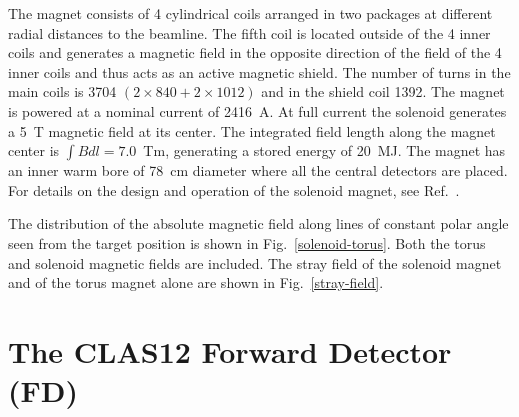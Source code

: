\documentclass[final,3p,twocolumn]{elsarticle}
\begin{document}
The magnet consists of 4 cylindrical coils arranged in two packages at different radial distances to the beamline.
The fifth coil is located outside of the 4 inner coils and generates a magnetic field in the opposite direction of the
field of the 4 inner coils and thus acts as an active magnetic shield. The number of turns in the main coils is 3704
$(2 \times 840 + 2 \times 1012)$ and in the shield coil 1392. The magnet is powered at a nominal current of
2416~A. At full current the solenoid generates a 5~T magnetic field at its center. The integrated field length along
the magnet center is $\int Bdl = 7.0$~Tm, generating a stored energy of 20~MJ. The magnet has an inner warm bore
of 78~cm diameter where all the central detectors are placed.  For details on the design and operation of the
solenoid magnet, see Ref.~\cite{clas12-magnets}.

The distribution of the absolute magnetic field along lines of constant polar angle seen from the target position is
shown in Fig.~\ref{solenoid-torus}. Both the torus and solenoid magnetic fields are included. The stray field of the
solenoid magnet and of the torus magnet alone are shown in Fig.~\ref{stray-field}.  



\section{The CLAS12 Forward Detector (FD)}
\end{document}
